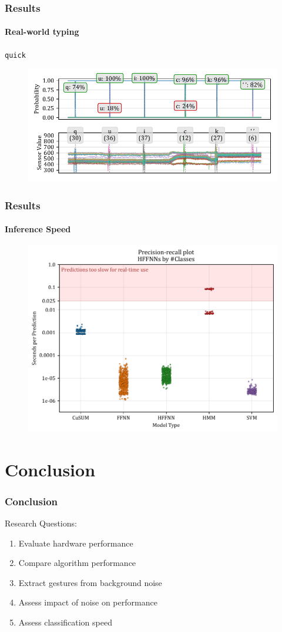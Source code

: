 \documentclass[xcolor={svgnames,table},10pt,fleqn]{beamer}
\begin{document}
\begin{frame}
    \frametitle{Results}
    \framesubtitle{Real-world typing}
    \centering
    \texttt{quick }
    \begin{figure}[h]
        \centering
        \includegraphics[width=\textwidth]{imgs/05_pred_plot_0900_to_1800_quick.pdf}
    \end{figure}
\end{frame}

\begin{frame}
    \frametitle{Results}
    \framesubtitle{Inference Speed}
    \begin{figure}[h]
        \centering
        \includegraphics[width=\textwidth]{imgs/inference_time_per_obs_per_model.pdf}
    \end{figure}
\end{frame}

\section{Conclusion}
\begin{frame}
    \frametitle{Conclusion}
    Research Questions:
    \begin{enumerate}
        \item Evaluate hardware performance
        \item Compare algorithm performance
        \item Extract gestures from background noise
        \item Assess impact of noise on performance
        \item Assess classification speed
    \end{enumerate}
\end{frame}
\end{document}

